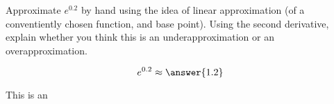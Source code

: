 \documentclass{ximera}
\author{Steven Gubkin}
\begin{document}
\begin{exercise}




Approximate $e^{0.2}$ by hand using the idea of linear approximation (of a conventiently chosen function, and base point). Using the second derivative, explain whether you think this is an underapproximation or an overapproximation.

\begin{prompt}
	$$e^{0.2} \approx \answer{1.2}$$

This is an
\begin{multipleChoice}
\end{multipleChoice}
\end{prompt}

\end{exercise}
\end{document}

